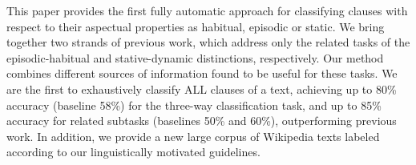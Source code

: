 This paper provides the first fully automatic approach for classifying clauses with respect to their aspectual properties as habitual, episodic or static. We bring together two strands of previous work, which address only the related tasks of the episodic-habitual and stative-dynamic distinctions, respectively. Our method combines different sources of information found to be useful for these tasks. We are the first to exhaustively classify ALL clauses of a text, achieving up to 80\% accuracy (baseline 58\%) for the three-way classification task, and up to 85\% accuracy for related subtasks (baselines 50\% and 60\%), outperforming previous work. In addition, we provide a new large corpus of Wikipedia texts labeled according to our linguistically motivated guidelines.
